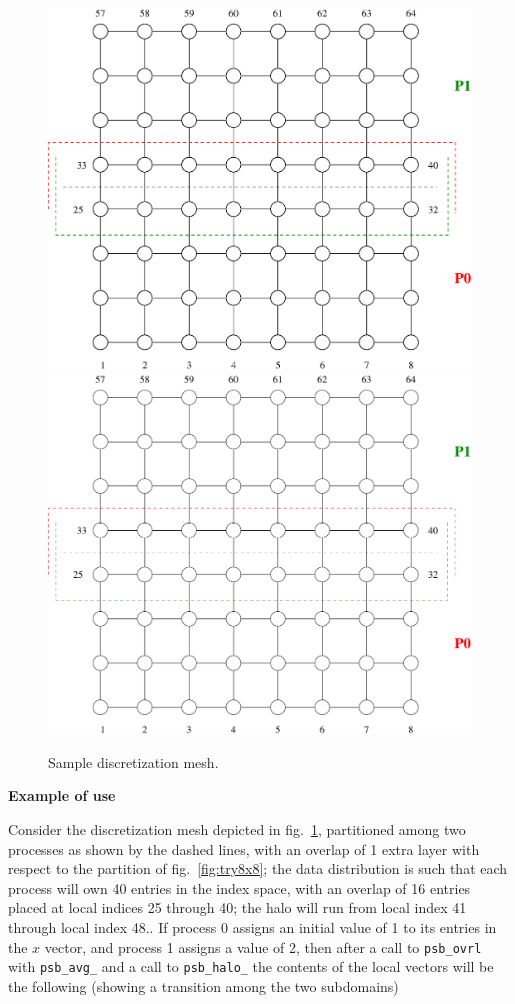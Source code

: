\begin{figure}[h] 
\begin{center}
\ifcase\pdfoutput
\includegraphics[scale=0.65]{figures/try8x8_ov.eps}
\or
{\includegraphics[scale=0.65]{figures/try8x8_ov}}
\fi
\end{center}
\caption{Sample discretization mesh.\label{fig:try8x8_ov}}
\end{figure}
{\par\noindent\large\bfseries Example of use}
Consider the discretization mesh depicted in fig.~\ref{fig:try8x8_ov},
partitioned among two processes as shown by the dashed lines, with an
overlap of 1 extra layer with respect to the partition of
fig.~\ref{fig:try8x8}; the data 
distribution is such that each process will own 40 entries in the
index space, with an overlap of 16  entries placed at local indices 25 
through 40; the halo will run from local index 41 through local index 48.. If process 0 assigns an initial value of 1 to its entries
in the $x$ vector, and process 1 assigns a value of 2, then after a
call to \verb|psb_ovrl| with \verb|psb_avg_| and a call to
\verb|psb_halo_| the contents of the local vectors will be the
following (showing a transition among the two subdomains)  

